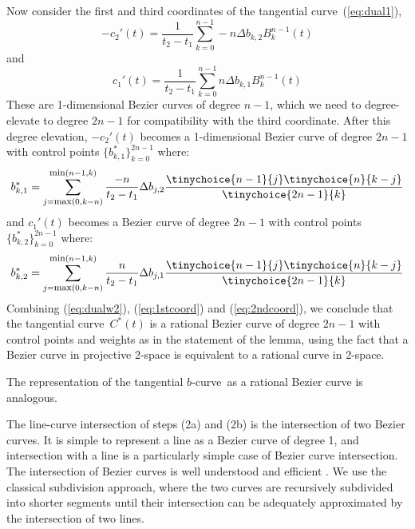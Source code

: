 \documentclass[11pt]{article}
\newcommand{\tang}{tangential curve\ }
\newcommand{\btang}{tangential $b$-curve\ }
\begin{document}
{Now consider the first and third coordinates of the \tang (\ref{eq:dual1}), 
\begin{equation}
\label{eq:dualx}
-c_2'(t) = \frac{1}{t_2 - t_1} \sum_{k=0}^{n-1} -n \Delta b_{k,2} B_k^{n-1}(t)
\end{equation}
and
\begin{equation}
\label{eq:dualy}
c_1'(t)  = \frac{1}{t_2 - t_1} \sum_{k=0}^{n-1}  n \Delta b_{k,1} B_k^{n-1}(t)
\end{equation}
These are 1-dimensional Bezier curves of degree $n-1$,
which we need to degree-elevate to degree $2n-1$
for compatibility with the third coordinate.
After this degree elevation, $-c_2 ' (t)$ becomes a 1-dimensional Bezier curve of degree $2n-1$
with control points $\{b^*_{k,1} \}_{k=0}^{2n-1}$ where:
\begin{equation}
\label{eq:1stcoord}
b^*_{k,1} = 
\sum_{j=\mbox{\footnotesize{max}}(0,k-n)}^{\mbox{\footnotesize{min}}(n-1,k)} 
	\frac{-n}{t_2 - t_1} \Delta b_{j,2}
	\frac{ \tinychoice{n-1}{j} \tinychoice{n}{k-j} }{ \tinychoice{2n-1}{k} }
\end{equation}
%
and $c_1 ' (t)$ becomes a Bezier curve of degree $2n-1$ with control points 
$\{b^*_{k,2} \}_{k=0}^{2n-1}$ where:
\begin{equation}
\label{eq:2ndcoord}
b^*_{k,2} = 
\sum_{j=\mbox{\footnotesize{max}}(0,k-n)}^{\mbox{\footnotesize{min}}(n-1,k)} 
	\frac{n}{t_2 - t_1} \Delta b_{j,1}
	\frac{ \tinychoice{n-1}{j} \tinychoice{n}{k-j} }{ \tinychoice{2n-1}{k} }
\end{equation}
%
Combining (\ref{eq:dualw2}), (\ref{eq:1stcoord}) and (\ref{eq:2ndcoord}),
we conclude that the \tang $C^*(t)$
is a rational Bezier curve of degree $2n-1$ with control points 
and weights as in the statement of the lemma,
using the fact that a Bezier curve in projective 2-space is equivalent
to a rational curve in 2-space.
\QED
}

The representation of the \btang as a rational Bezier curve is analogous.

The line-curve intersection of steps (2a) and (2b) is the intersection
of two Bezier curves.
It is simple to represent a line as a Bezier curve of degree 1,
and intersection with a line is a particularly simple case of Bezier
curve intersection.
The intersection of Bezier curves is well understood and efficient \cite{sederberg86}.
We use the classical subdivision approach, where the two curves are recursively
subdivided into shorter segments until their intersection can be adequately
approximated by the intersection of two lines.
\end{document}
